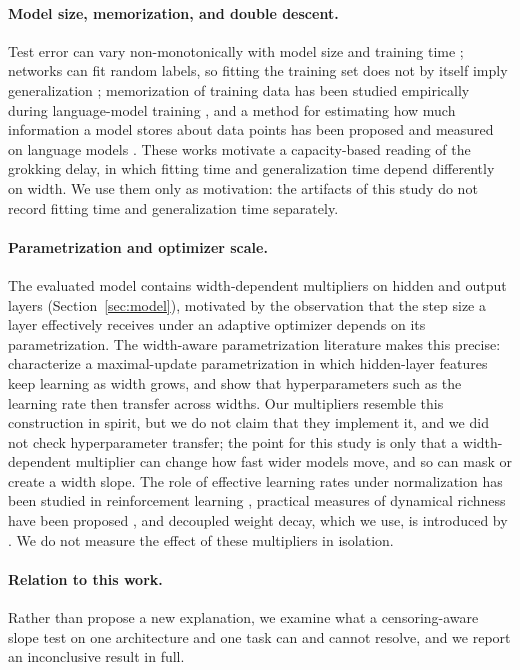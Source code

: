 \documentclass{article}
\begin{document}
\paragraph{Model size, memorization, and double descent.} Test error can vary non-monotonically with model size and training time \citep{Nakkiran2019DeepDD}; networks can fit random labels, so fitting the training set does not by itself imply generalization \citep{Zhang2016UnderstandingDL}; memorization of training data has been studied empirically during language-model training \citep{Tirumala2022MemorizationWO}, and a method for estimating how much information a model stores about data points has been proposed and measured on language models \citep{Morris2025HowMD}. These works motivate a capacity-based reading of the grokking delay, in which fitting time and generalization time depend differently on width. We use them only as motivation: the artifacts of this study do not record fitting time and generalization time separately.

\paragraph{Parametrization and optimizer scale.} The evaluated model contains width-dependent multipliers on hidden and output layers (Section~\ref{sec:model}), motivated by the observation that the step size a layer effectively receives under an adaptive optimizer depends on its parametrization. The width-aware parametrization literature makes this precise: \citet{Yang2021TensorPI} characterize a maximal-update parametrization in which hidden-layer features keep learning as width grows, and \citet{Yang2022TensorPV} show that hyperparameters such as the learning rate then transfer across widths. Our multipliers resemble this construction in spirit, but we do not claim that they implement it, and we did not check hyperparameter transfer; the point for this study is only that a width-dependent multiplier can change how fast wider models move, and so can mask or create a width slope. The role of effective learning rates under normalization has been studied in reinforcement learning \citep{Lyle2024NormalizationAE}, practical measures of dynamical richness have been proposed \citep{Nam2024DecouplingDR}, and decoupled weight decay, which we use, is introduced by \citet{Loshchilov2017DecoupledWD}. We do not measure the effect of these multipliers in isolation.

\paragraph{Relation to this work.} Rather than propose a new explanation, we examine what a censoring-aware slope test on one architecture and one task can and cannot resolve, and we report an inconclusive result in full.
\end{document}
